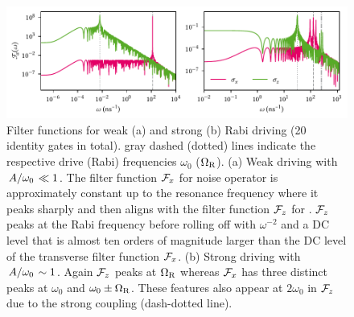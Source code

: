 \begin{figure}
    \centering
    \includegraphics{img/pdf/filter_functions/rabi_driving_weak_vs_strong}
    \caption[]{
        Filter functions for weak (a) and strong (b) Rabi driving (\num{20} identity gates in total).
        gray dashed (dotted) lines indicate the respective drive (Rabi) frequencies $\omega_0$ ($\Omega_{\mathrm{R}}$).
        (a) Weak driving with $\flatfrac{A}{\omega_\mr{0}}\ll 1$.
        The filter function $\mathcal{F}_{x}$ for noise operator \sx is approximately constant up to the resonance frequency where it peaks sharply and then aligns with the filter function $\mathcal{F}_{z}$ for \sz.
        $\mathcal{F}_{z}$ peaks at the Rabi frequency before rolling off with $\omega^{-2}$ and a DC level that is almost ten orders of magnitude larger than the DC level of the transverse filter function $\mathcal{F}_{x}$.
        (b) Strong driving with $\flatfrac{A}{\omega_\mr{0}}\sim 1$.
        Again $\mathcal{F}_{z}$ peaks at $\Omega_{\mathrm{R}}$ whereas $\mathcal{F}_{x}$ has three distinct peaks at $\omega_0$ and $\omega_0\pm\Omega_{\mathrm{R}}$.
        These features also appear at $2\omega_0$ in $\mathcal{F}_{z}$ due to the strong coupling (dash-dotted line).
    }
    \label{fig:ff:filter_function:rabi:weak_vs_strong}
\end{figure}

